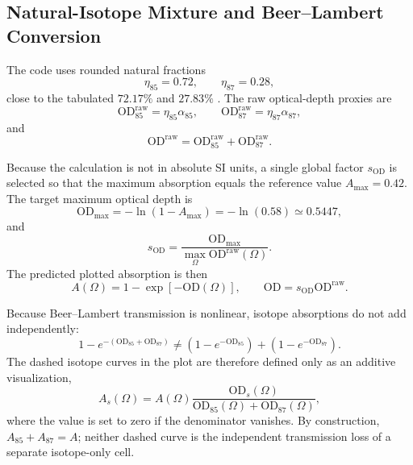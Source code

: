 \subsection{Natural-Isotope Mixture and Beer--Lambert Conversion}
\label{subsec:dm_mixture}

The code uses rounded natural fractions
\begin{equation}
\eta_{85}=0.72,
\qquad
\eta_{87}=0.28,
\label{eq:rounded_abundances}
\end{equation}
close to the tabulated \(72.17\%\) and \(27.83\%\)
\cite{Steck85,Steck87}.  The raw optical-depth proxies are
\begin{equation}
\mathrm{OD}_{85}^{\mathrm{raw}}
=\eta_{85}\alpha_{85},
\qquad
\mathrm{OD}_{87}^{\mathrm{raw}}
=\eta_{87}\alpha_{87},
\end{equation}
and
\begin{equation}
\mathrm{OD}^{\mathrm{raw}}
=
\mathrm{OD}_{85}^{\mathrm{raw}}
+
\mathrm{OD}_{87}^{\mathrm{raw}}.
\label{eq:raw_optical_depth}
\end{equation}

Because the calculation is not in absolute SI units, a single global factor
\(s_{\mathrm{OD}}\) is selected so that the maximum absorption equals the
reference value \(A_{\max}=0.42\).  The target maximum optical depth is
\begin{equation}
\mathrm{OD}_{\max}
=
-\ln(1-A_{\max})
=
-\ln(0.58)
\simeq0.5447,
\end{equation}
and
\begin{equation}
s_{\mathrm{OD}}
=
\frac{\mathrm{OD}_{\max}}
{\max_\Omega\mathrm{OD}^{\mathrm{raw}}(\Omega)}.
\label{eq:OD_scale}
\end{equation}
The predicted plotted absorption is then
\begin{equation}
A(\Omega)
=
1-\exp[-\mathrm{OD}(\Omega)],
\qquad
\mathrm{OD}
=
s_{\mathrm{OD}}\mathrm{OD}^{\mathrm{raw}}.
\label{eq:beer_lambert_model}
\end{equation}

Because Beer--Lambert transmission is nonlinear, isotope absorptions do not
add independently:
\begin{equation}
1-e^{-(\mathrm{OD}_{85}+\mathrm{OD}_{87})}
\neq
(1-e^{-\mathrm{OD}_{85}})
+
(1-e^{-\mathrm{OD}_{87}}).
\end{equation}
The dashed isotope curves in the plot are therefore defined only as an
additive visualization,
\begin{equation}
A_s(\Omega)
=
A(\Omega)
\frac{\mathrm{OD}_s(\Omega)}
{\mathrm{OD}_{85}(\Omega)+\mathrm{OD}_{87}(\Omega)},
\label{eq:isotope_visual_decomposition}
\end{equation}
where the value is set to zero if the denominator vanishes.  By construction,
\(A_{85}+A_{87}=A\); neither dashed curve is the independent transmission loss
of a separate isotope-only cell.

